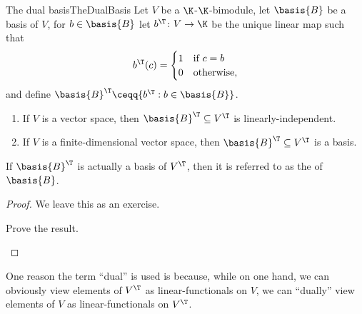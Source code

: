 \begin{prp}{The dual basis}{TheDualBasis}
	Let $V$ be a $\K$-$\K$-bimodule, let $\basis{B}$ be a basis of $V$, for $b\in \basis{B}$ let $b^{\T}\colon V\rightarrow \K$ be the unique linear map such that
	\begin{equation}
	b^{\T}(c)=\begin{cases}1 & \text{if }c=b \\ 0 & \text{otherwise,}\end{cases}
	\end{equation}
	and define $\basis{B}^{\T}\ceqq \{ b^{\T}:b\in \basis{B}\}$.
	\begin{enumerate}
		\item If $V$ is a vector space, then $\basis{B}^{\T}\subseteq V^{\T}$ is linearly-independent.
		\item If $V$ is a finite-dimensional vector space, then $\basis{B}^{\T}\subseteq V^{\T}$ is a basis.
	\end{enumerate}
	\begin{rmk}
		If $\basis{B}^{\T}$ is actually a basis of $V^{\T}$, then it is referred to as the  of $\basis{B}$.
	\end{rmk}
	\begin{proof}
		We leave this as an exercise.
		\begin{exr}[breakable=false]{}{}
			Prove the result.
		\end{exr}
	\end{proof}
\end{prp}
One reason the term ``dual'' is used is because, while on one hand, we can obviously view elements of $V^{\T}$ as linear-functionals on $V$, we can ``dually'' view elements of $V$ as linear-functionals on $V^{\T}$.
